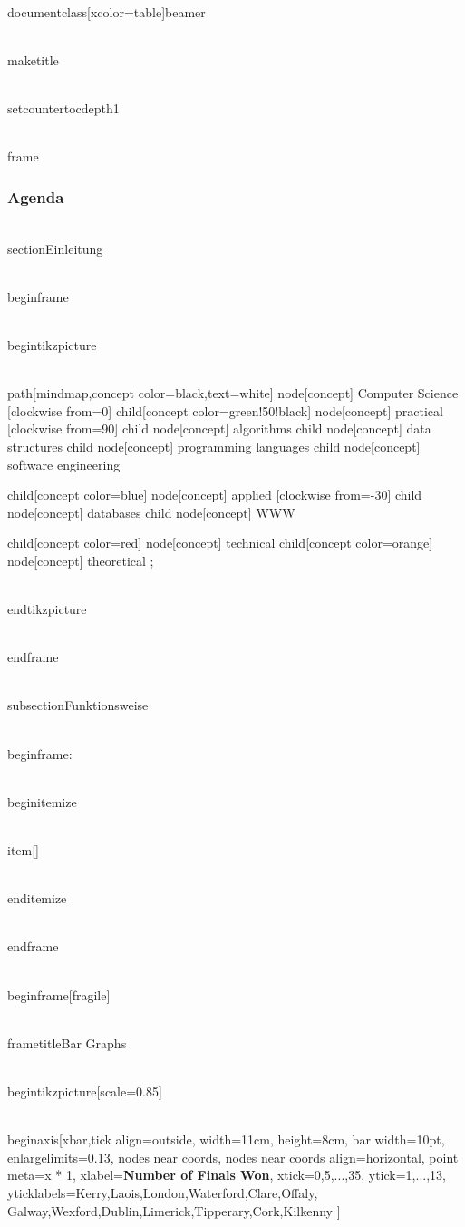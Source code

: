 \\documentclass[xcolor=table]{beamer}
\begin{document}
\\maketitle

\\setcounter{tocdepth}{1}


\\frame{\frametitle{Agenda}\tableofcontents}


\\section{Einleitung}

\\begin{frame}{\secname}

\\begin{tikzpicture}

\\path[mindmap,concept color=black,text=white]
node[concept] {Computer Science} [clockwise from=0]
child[concept color=green!50!black] {
node[concept] {practical} [clockwise from=90]
child { node[concept] {algorithms} }
child { node[concept] {data structures} }
child { node[concept] {pro\-gramming languages} }
child { node[concept] {software engineer\-ing} }
}  

child[concept color=blue] {
node[concept] {applied} [clockwise from=-30]
child { node[concept] {databases} }
child { node[concept] {WWW} }
}

child[concept color=red] { node[concept] {technical} }
child[concept color=orange] { node[concept] {theoretical} };

\\end{tikzpicture}

\\end{frame}


\\subsection{Funktionsweise}

\\begin{frame}{\secname : \subsecname}

    \\begin{itemize}

        \\item[] 

    \\end{itemize}

\\end{frame}  


\\begin{frame}[fragile]

\\frametitle{Bar Graphs}

\\begin{tikzpicture}[scale=0.85]

\\begin{axis}[xbar,tick align=outside,
    width=11cm,
    height=8cm,
    bar width={10pt},
    enlargelimits=0.13,
    nodes near coords,
    nodes near coords align=horizontal,
    point meta=x * 1, %
    xlabel=\textbf{Number of Finals Won},
    xtick={0,5,...,35},
    ytick={1,...,13},
    yticklabels={Kerry,Laois,London,Waterford,Clare,Offaly,
    Galway,Wexford,Dublin,Limerick,Tipperary,Cork,Kilkenny}
]
\end{document}
